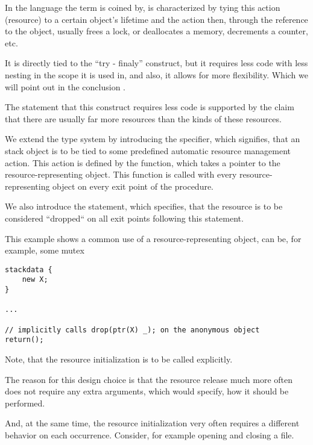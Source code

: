 In the language the term is coined by, is characterized by tying this action (resource) to a certain object's lifetime and the action then, through the reference to the object, usually frees a lock, or deallocates a memory, decrements a counter, etc.

It is directly tied to the ``try - finaly''  construct, but it requires less code with less nesting in the scope it is used in, and also, it allows for more flexibility. Which we will point out in the conclusion .

The statement that this construct requires less code is supported by the claim that there are usually far more resources than the kinds of these resources.

We extend the type system by introducing the  specifier, which signifies, that an stack object is to be tied to some predefined automatic resource management action. This action is defined by the  function, which takes a pointer to the resource-representing object. This function is called with every resource-representing object on every exit point of the procedure.

We also introduce the  statement, which specifies, that the resource is to be considered ``dropped`` on all exit points following this statement.

\begin{ex}
    This example shows a common use of a resource-representing object,  can be, for example, some mutex
    \begin{lstlisting}
stackdata {
    new X;
}

...

// implicitly calls drop(ptr(X) _); on the anonymous object
return();
    \end{lstlisting}
\end{ex}

\begin{remark}
    Note, that the resource initialization is to be called explicitly.

    The reason for this design choice is that the resource release much more often does not require any extra arguments, which would specify, how it should be performed.

    And, at the same time, the resource initialization very often requires a different behavior on each occurrence. Consider, for example opening and closing a file.
\end{remark}

